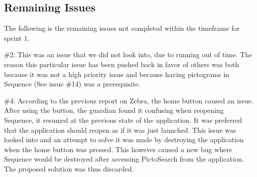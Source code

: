 \subsection{Remaining Issues}
The following is the remaining issues not completed within the timeframe for sprint 1.

\#2: This was an issue that we did not look into, due to running out of time. The reason this particular issue has been pushed back in favor of others was both because it was not a high priority issue and because having pictograms in Sequence (See issue \#14) was a prerequisite. 

\#4: According to the previous report on Zebra, \citep{Zebra} the home button caused an issue. After using the button, the guardian found it confusing when reopening Sequence, it resumed at the previous state of the application. It was preferred that the application should reopen as if it was just launched. This issue was looked into and an attempt to solve it was made by destroying the application when the home button was pressed. This however caused a new bug where Sequence would be destroyed after accessing PictoSearch from the application. The proposed solution was thus discarded.

